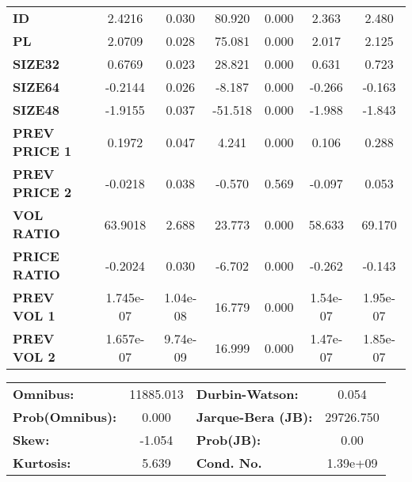 \documentclass{article}
\begin{document}
\begin{center}
\begin{tabular}{lcccccc}
\textbf{ID}    &       2.4216  &        0.030     &    80.920  &         0.000        &        2.363    &        2.480     \\
\textbf{PL}    &       2.0709  &        0.028     &    75.081  &         0.000        &        2.017    &        2.125     \\
\textbf{SIZE32}    &       0.6769  &        0.023     &    28.821  &         0.000        &        0.631    &        0.723     \\
\textbf{SIZE64}    &      -0.2144  &        0.026     &    -8.187  &         0.000        &       -0.266    &       -0.163     \\
\textbf{SIZE48}   &      -1.9155  &        0.037     &   -51.518  &         0.000        &       -1.988    &       -1.843     \\
\textbf{PREV PRICE 1}   &       0.1972  &        0.047     &     4.241  &         0.000        &        0.106    &        0.288     \\
\textbf{PREV PRICE 2}   &      -0.0218  &        0.038     &    -0.570  &         0.569        &       -0.097    &        0.053     \\
\textbf{VOL RATIO}   &      63.9018  &        2.688     &    23.773  &         0.000        &       58.633    &       69.170     \\
\textbf{PRICE RATIO}   &      -0.2024  &        0.030     &    -6.702  &         0.000        &       -0.262    &       -0.143     \\
\textbf{PREV VOL 1}   &    1.745e-07  &     1.04e-08     &    16.779  &         0.000        &     1.54e-07    &     1.95e-07     \\
\textbf{PREV VOL 2}   &    1.657e-07  &     9.74e-09     &    16.999  &         0.000        &     1.47e-07    &     1.85e-07     \\
\bottomrule
\end{tabular}
\begin{tabular}{lclc}
\textbf{Omnibus:}       & 11885.013 & \textbf{  Durbin-Watson:     } &     0.054  \\
\textbf{Prob(Omnibus):} &    0.000  & \textbf{  Jarque-Bera (JB):  } & 29726.750  \\
\textbf{Skew:}          &   -1.054  & \textbf{  Prob(JB):          } &      0.00  \\
\textbf{Kurtosis:}      &    5.639  & \textbf{  Cond. No.          } &  1.39e+09  \\
\bottomrule
\end{tabular}
\end{center}
\end{document}

